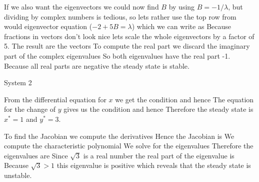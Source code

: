If we also want the eigenvectors we could now find $B$ by  using $B=-1/\lambda$, but dividing by complex numbers is tedious, so lets rather use the top row from would eigenvector equation ($-2+5B=\lambda$) which we can write as 
Because fractions in vectors don't look nice lets scale the whole eigenvectors by a factor of 5. The result are the vectors 
To compute the real part we discard the imaginary part of the complex eigenvalues  
So both eigenvalues have the real part -1. Because all real parts are negative the steady state is stable.  

\subquestion 
System 2

\solution 
From the differential equation for $x$ we get the condition 
and hence 
The equation for the change of $y$ gives us the condition 
and hence 
Therefore the steady state is $x^*=1$ and $y^*=3$.

To find the Jacobian we compute the derivatives 
Hence the Jacobian is 
We compute the characteristic polynomial 
We solve for the eigenvalues 
Therefore the eigenvalues are 
Since $\sqrt{3}$ is a real number the real part of the eigenvalue is 
Because $\sqrt{3}>1$ this eigenvalue is positive which reveals that the steady state is unstable. 
